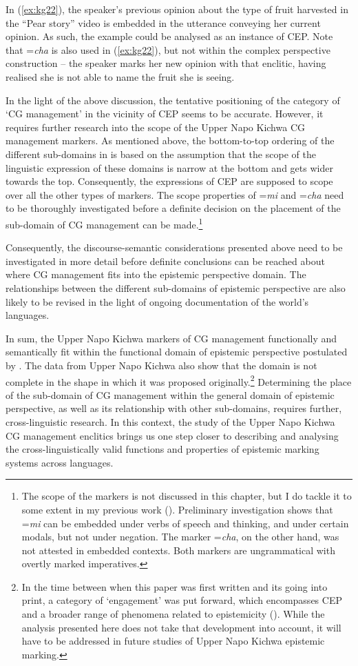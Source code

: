 \documentclass[output=paper]{langscibook}
\begin{document}
In (\ref{ex:kg22}), the speaker’s previous opinion about the type of fruit harvested in the “Pear story” video is embedded in the utterance conveying her current opinion. As such, the example could be analysed as an instance of CEP. Note that =\textit{cha} is also used in (\ref{ex:kg22}), but not within the complex perspective construction -- the speaker marks her new opinion with that enclitic, having realised she is not able to name the fruit she is seeing.

In the light of the above discussion, the tentative positioning of the category of ‘CG management’ in the vicinity of CEP seems to be accurate. However, it requires further research into the scope of the Upper Napo Kichwa CG management markers. As mentioned above, the bottom-to-top ordering of the different sub-domains in  is based on the assumption that the scope of the linguistic expression of these domains is narrow at the bottom and gets wider towards the top. Consequently, the expressions of CEP are supposed to scope over all the other types of markers. The scope properties of =\textit{mi} and =\textit{cha} need to be thoroughly investigated before a definite decision on the placement of the sub-domain of CG management can be made.\footnote{The scope of the markers is not discussed in this chapter, but I do tackle it to some extent in my previous work (\citealt[ch.5]{Grzech2016a}). Preliminary investigation shows that =\textit{mi} can be embedded under verbs of speech and thinking, and under certain modals, but not under negation. The marker =\textit{cha}, on the other hand, was not attested in embedded contexts. Both markers are ungrammatical with overtly marked imperatives.}

Consequently, the discourse-semantic considerations presented above need to be investigated in more detail before definite conclusions can be reached about where CG management fits into the epistemic perspective domain. The relationships between the different sub-domains of epistemic perspective are also likely to be revised in the light of ongoing documentation of the world’s languages.

In sum, the Upper Napo Kichwa markers of CG management functionally and semantically fit within the functional domain of epistemic perspective postulated by \cite{Bergqvist2017}. The data from Upper Napo Kichwa also show that the domain is not complete in the shape in which it was proposed originally.\footnote{In the time between when this paper was first written and its going into print, a category of ‘engagement’ was put forward, which encompasses CEP and a broader range of phenomena related to epistemicity (\citealt{Evansetal2018}). While the analysis presented here does not take that development into account, it will have to be addressed in future studies of Upper Napo Kichwa epistemic marking.}
Determining the place of the sub-domain of CG management within the general domain of epistemic perspective, as well as its relationship with other sub-domains, requires further, cross-linguistic research. In this context, the study of the Upper Napo Kichwa CG management enclitics brings us one step closer to describing and analysing the cross-linguistically valid functions and properties of epistemic marking systems across languages.
\end{document}

